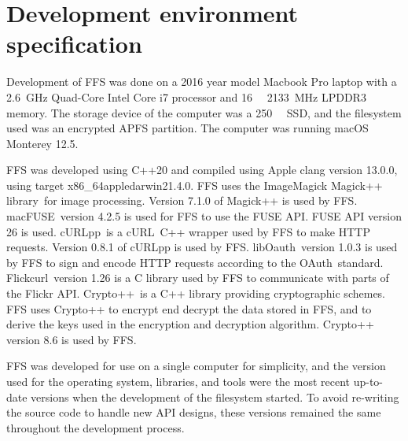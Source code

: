 \section{Development environment specification}
\label{sec:dev_env}
Development of FFS was done on a 2016 year model Macbook Pro laptop with a \SI{2.6}{\giga\hertz} Quad-Core Intel Core i7 processor and \SI{16}{\giga\byte} \SI{2133}{\mega\hertz} LPDDR3 memory. The storage device of the computer was a \SI{250}{\giga\byte} SSD, and the filesystem used was an encrypted APFS partition. The computer was running macOS Monterey 12.5.

FFS was developed using C++20 and compiled using Apple clang version 13.0.0, using target x86\_64\-apple\-darwin21.4.0. FFS uses the ImageMagick Magick++ library\,\cite{ImageMagick2022} for image processing. Version 7.1.0 of Magick++ is used by FFS. macFUSE\,\cite{HomeMacFUSE} version 4.2.5 is used for FFS to use the FUSE API. FUSE API version 26 is used. cURLpp\,\cite{barrette-lapierreCURLpp2022} is a cURL\,\cite{CurlCurl2022} C++ wrapper used by FFS to make HTTP requests. Version 0.8.1 of cURLpp is used by FFS. libOauth\,\cite{Liboauth} version 1.0.3 is used by FFS to sign and encode HTTP requests according to the OAuth\,\cite{barrette-lapierreCURLpp2022} standard. Flickcurl\,\cite{beckettFlickcurlLibraryFlickr} version 1.26 is a C library used by FFS to communicate with parts of the Flickr API. Crypto++\,\cite{CryptoLibraryFree} is a C++ library providing cryptographic schemes. FFS uses Crypto++ to encrypt end decrypt the data stored in FFS, and to derive the keys used in the encryption and decryption algorithm. Crypto++ version 8.6 is used by FFS.

FFS was developed for use on a single computer for simplicity, and the version used for the operating system, libraries, and tools were the most recent up-to-date versions when the development of the filesystem started. To avoid re-writing the source code to handle new API designs, these versions remained the same throughout the development process.